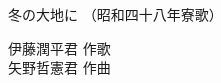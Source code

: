 \documentclass[10pt,b5j]{tarticle} %
\begin{document}
\begin{minipage}[c]{0.7\hsize} %
    \begin{center}
        {\LARGE
            冬の大地に %
        }
        {\small 
            （昭和四十八年寮歌） %
        }
    \end{center}
\end{minipage}
\begin{minipage}[c]{0.3\hsize} %
    \begin{flushright} %
        伊藤潤平君 作歌\\矢野哲憲君 作曲 %
    \end{flushright}
\end{minipage}
\end{document}
